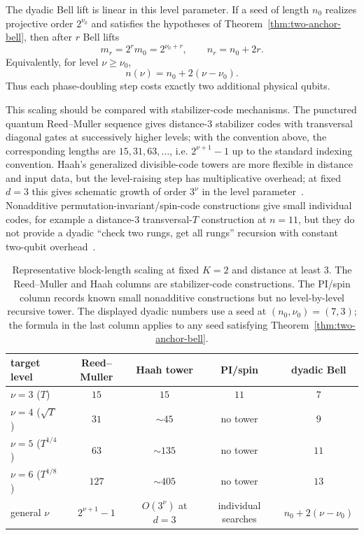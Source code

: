 \documentclass[11pt]{article}
\begin{document}
The dyadic Bell lift is linear in this level parameter.  If a seed of length $n_0$ realizes
projective order $2^{\nu_0}$ and satisfies the hypotheses of
Theorem~\ref{thm:two-anchor-bell}, then after $r$ Bell lifts
\begin{equation}
  m_r=2^r m_0=2^{\nu_0+r},
  \qquad
  n_r=n_0+2r.
  \label{eq:dyadic-scaling-r}
\end{equation}
Equivalently, for level $\nu\ge \nu_0$,
\begin{equation}
  n(\nu)=n_0+2(\nu-\nu_0).
  \label{eq:dyadic-scaling-level}
\end{equation}
Thus each phase-doubling step costs exactly two additional physical qubits.

This scaling should be compared with stabilizer-code mechanisms.  The punctured quantum
Reed--Muller sequence gives distance-$3$ stabilizer codes with transversal diagonal gates at
successively higher levels; with the convention above, the corresponding lengths are
$15,31,63,\ldots$, i.e. $2^{\nu+1}-1$ up to the standard indexing convention.  Haah's generalized
divisible-code towers are more flexible in distance and input data, but the level-raising step has
multiplicative overhead; at fixed $d=3$ this gives schematic growth of order $3^\nu$
in the level parameter~\cite{Haah2018}.  Nonadditive permutation-invariant/spin-code constructions
give small individual codes, for example a distance-$3$ transversal-$T$ construction at
$n=11$, but they do not provide a dyadic ``check two rungs, get all rungs'' recursion
with constant two-qubit overhead~\cite{KubischtaTeixeira2023Exotic,KubischtaTeixeira2024PI}.

\begin{table}[t]
\centering
\small
\renewcommand{\arraystretch}{1.18}
\begin{tabular}{lcccc}
\hline\hline
\textbf{target level} & \textbf{Reed--Muller} & \textbf{Haah tower} & \textbf{PI/spin} & \textbf{dyadic Bell} \\
\hline
$\nu=3$ \;($T$)        & $15$  & $15$       & $11$ & $7$ \\
$\nu=4$ \;($\sqrt T$) & $31$  & $\sim45$  & no tower & $9$ \\
$\nu=5$ \;($T^{1/4}$) & $63$  & $\sim135$ & no tower & $11$ \\
$\nu=6$ \;($T^{1/8}$) & $127$ & $\sim405$ & no tower & $13$ \\
\hline
general $\nu$ & $2^{\nu+1}-1$ & $O(3^\nu)$ at $d=3$ & individual searches & $n_0+2(\nu-\nu_0)$ \\
\hline\hline
\end{tabular}
\caption{Representative block-length scaling at fixed $K=2$ and distance at least $3$.  The
Reed--Muller and Haah columns are stabilizer-code constructions.  The PI/spin column records known
small nonadditive constructions but no level-by-level recursive tower.  The displayed dyadic
numbers use a seed at $(n_0,\nu_0)=(7,3)$; the formula in the last column applies to any seed
satisfying Theorem~\ref{thm:two-anchor-bell}.}
\label{tab:scaling-comparison}
\end{table}
\end{document}
